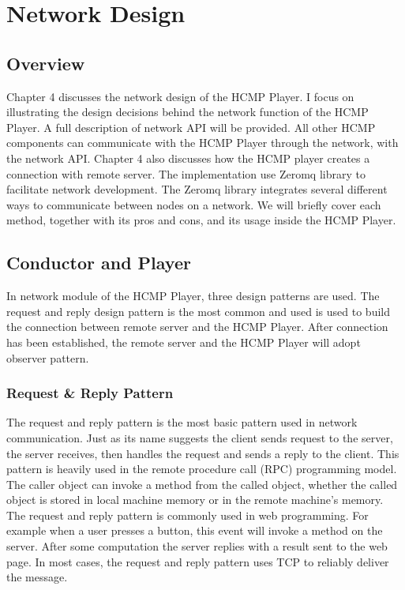 
\chapter{Network Design}

\section{Overview}

Chapter 4 discusses the network design of the HCMP Player.  
I focus on illustrating the design decisions behind the network function of    
the HCMP Player. A full description of network API will be provided. All other
HCMP components can communicate with the HCMP Player through the network,
with the network API. Chapter 4 also discusses how the HCMP player 
creates a connection with remote server. The implementation 
use Zeromq library to facilitate network development. The Zeromq library 
integrates several different ways to communicate between nodes on a network.
We will briefly cover each method, together with its pros and cons, and 
its usage inside the HCMP Player.

\section{Conductor and Player}
In network module of the HCMP Player, three design patterns are used. The 
request and reply design pattern is the most common and used is used to 
build the connection between remote server
and the HCMP Player. After connection has been established, the remote server and
the HCMP Player will adopt observer pattern. 

\subsection{Request \& Reply Pattern}
The request and reply pattern is the most basic pattern used in network 
communication. Just as its name suggests the client sends request to the server,
the server receives, then handles the request and sends a reply to
the client. This pattern is heavily used in the remote procedure call (RPC) 
programming model. The caller object can invoke a method from the called 
object, whether the called object is stored in local machine memory or
in the remote machine's memory. The request and reply pattern is commonly used
in web programming. For example when a user presses a button, this event will 
invoke a method on the server. After some computation the server replies with 
a result sent to the web page. In most cases, the request and reply pattern
uses TCP to reliably deliver the message. 


